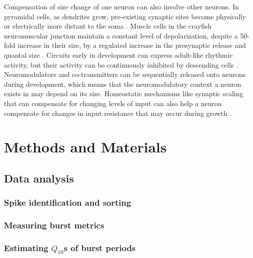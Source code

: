 \documentclass[9pt,lineno]{elife}
\begin{document}
Compensation of size change of one neuron can also involve other neurons. In pyramidal cells, as dendrites grow, pre-existing synaptic sites become physically or electrically more distant to the soma \citep{Davis:2003ev, Stuart:1995cz}. Muscle cells in the crayfish neuromuscular junction maintain a constant level of  depolarization, despite a 50-fold increase in their size, by a regulated increase in the presynaptic release and quantal size \citep{Pulver:2004ic, Davis:2003ev, Lnenicka:1983ib}. Circuits early in development can express adult-like rhythmic activity, but their activity can be continuously inhibited by descending cells \citep{Fenelon:Dh60FeLw,Humphreys:2018ta, Bentley:1970kp}. Neuromodulators and co-transmitters \citep{Fenelon:1999vn, Kilman:1999vr} can be sequentially released onto neurons during development, which means that the neuromodulatory context a neuron exists in may depend on its size. Homeostatic mechanisms like synaptic scaling that can compensate for changing levels of input can also help a neuron compensate for changes in input resistance that may occur during growth \citep{Turrigiano:2012hw, Turrigiano:2007bl}. 




\section{Methods and Materials}

\subsection*{Data analysis}

\subsubsection*{Spike identification and sorting}

\subsubsection*{Measuring burst metrics}

\subsubsection*{Estimating $Q_{10}$s of burst periods}




\appendix
\end{document}
